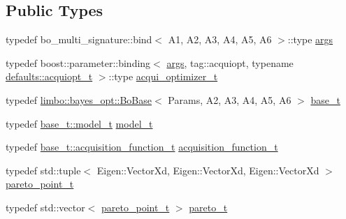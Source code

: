 \subsection*{Public Types}
\begin{DoxyCompactItemize}
\item 
typedef bo\+\_\+multi\+\_\+signature\+::bind$<$ A1, A2, A3, A4, A5, A6 $>$\+::type \hyperlink{classlimbo_1_1experimental_1_1bayes__opt_1_1_bo_multi_afbec2602c4a22ad0a1285cc813a51c58}{args}
\item 
typedef boost\+::parameter\+::binding$<$ \hyperlink{classlimbo_1_1experimental_1_1bayes__opt_1_1_bo_multi_afbec2602c4a22ad0a1285cc813a51c58}{args}, tag\+::acquiopt, typename \hyperlink{structlimbo_1_1experimental_1_1bayes__opt_1_1_bo_multi_1_1defaults_a24be1814310958ec5808cb9856cf8c74}{defaults\+::acquiopt\+\_\+t} $>$\+::type \hyperlink{classlimbo_1_1experimental_1_1bayes__opt_1_1_bo_multi_aeea7e1ae62b3116ea392b098c40a1676}{acqui\+\_\+optimizer\+\_\+t}
\item 
typedef \hyperlink{classlimbo_1_1bayes__opt_1_1_bo_base}{limbo\+::bayes\+\_\+opt\+::\+Bo\+Base}$<$ Params, A2, A3, A4, A5, A6 $>$ \hyperlink{classlimbo_1_1experimental_1_1bayes__opt_1_1_bo_multi_a62d938e4735374911ea55c4b4f8a6562}{base\+\_\+t}
\item 
typedef \hyperlink{classlimbo_1_1bayes__opt_1_1_bo_base_a1ddc93cc023a2d7d527deb4cc750624e}{base\+\_\+t\+::model\+\_\+t} \hyperlink{classlimbo_1_1experimental_1_1bayes__opt_1_1_bo_multi_a94e37f45e30ac591bacf36df6767d6ad}{model\+\_\+t}
\item 
typedef \hyperlink{classlimbo_1_1bayes__opt_1_1_bo_base_a02b14991b62e0f8c9bcf834220ed62e4}{base\+\_\+t\+::acquisition\+\_\+function\+\_\+t} \hyperlink{classlimbo_1_1experimental_1_1bayes__opt_1_1_bo_multi_af5c8c4b0a4912c1efa5e0156a83b06ab}{acquisition\+\_\+function\+\_\+t}
\item 
typedef std\+::tuple$<$ Eigen\+::\+Vector\+Xd, Eigen\+::\+Vector\+Xd, Eigen\+::\+Vector\+Xd $>$ \hyperlink{classlimbo_1_1experimental_1_1bayes__opt_1_1_bo_multi_a1a48dd47159458edc16374082379879e}{pareto\+\_\+point\+\_\+t}
\item 
typedef std\+::vector$<$ \hyperlink{classlimbo_1_1experimental_1_1bayes__opt_1_1_bo_multi_a1a48dd47159458edc16374082379879e}{pareto\+\_\+point\+\_\+t} $>$ \hyperlink{classlimbo_1_1experimental_1_1bayes__opt_1_1_bo_multi_ae2b586fb9056fdfba859b288927a2f1c}{pareto\+\_\+t}
\end{DoxyCompactItemize}
